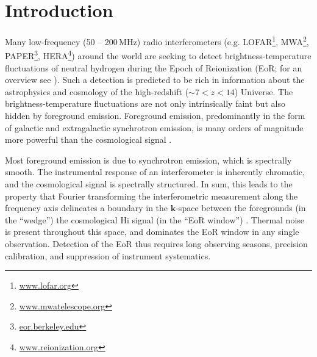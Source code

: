 \documentclass[twocolumn, trackchanges]{aastex61}
\begin{document}
\section{Introduction}
\label{sec:intro}

Many low-frequency (50 -- 200\,MHz) radio interferometers (e.g. LOFAR\footnote{\url{www.lofar.org}}, MWA\footnote{\url{www.mwatelescope.org}}, PAPER\footnote{\url{eor.berkeley.edu}}, HERA\footnote{\url{www.reionization.org}}) around the world are seeking to detect brightness-temperature fluctuations of neutral hydrogen during the Epoch of Reionization (EoR; for an overview see \citet{Furlanetto06}). 
Such a detection is predicted to be rich in information about the astrophysics and cosmology of the high-redshift ($\sim 7 < z < 14$) Universe.
The  brightness-temperature fluctuations are not only intrinsically faint but also hidden by foreground emission. Foreground emission, predominantly in the form of galactic and extragalactic synchrotron emission, is many orders of magnitude more powerful than the cosmological signal \citep[e.g.][]{Bernardi09, Pober13, Dillon14}.

Most foreground emission is due to synchrotron emission, which is spectrally smooth. The instrumental response of an interferometer is inherently chromatic, and the cosmological signal is spectrally structured. In sum, this leads to the property that Fourier transforming the interferometric measurement along the frequency axis delineates a boundary in the $\mathbf{k}$-space between the 
foregrounds (in the ``wedge'')  the cosmological {\sc Hi} signal (in the ``EoR window'')
\citep{Datta.10, Morales.12, Parsons.12a, Parsons.12b, Trott.12, Vedantham.12, Pober13, Thyagarajan.13, Pober.14, Liu.14a, Liu.14b, Dillon.15a, Dillon.15b, Nithya.15b, Nithya.15a}.
Thermal noise is present throughout this space, and dominates the EoR window in any single observation.
Detection of the EoR thus requires long observing seasons, precision calibration, and suppression of instrument systematics. 

\end{document}
